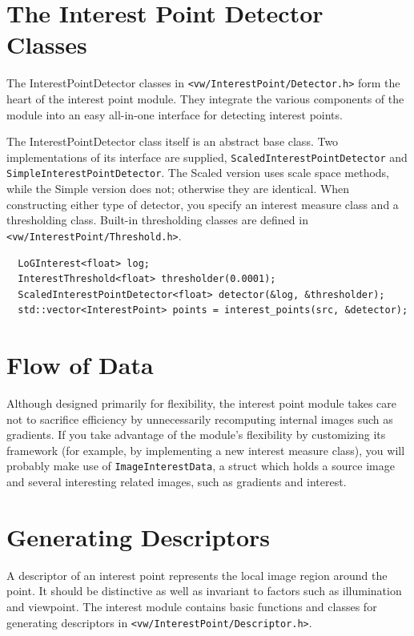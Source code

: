 \section{The Interest Point Detector Classes}
The InterestPointDetector classes in
{\tt <vw/InterestPoint/Detector.h>} form the heart of the interest
point module. They integrate the various components of the module
into an easy all-in-one interface for detecting interest points.

The InterestPointDetector class itself is an abstract base class.
Two implementations of its interface are supplied,
{\tt ScaledInterestPointDetector} and {\tt SimpleInterestPointDetector}.
The Scaled version uses scale space methods, while the Simple version
does not; otherwise they are identical. When constructing either
type of detector, you specify an interest measure class and a
thresholding class. Built-in thresholding classes are defined in
{\tt <vw/InterestPoint/Threshold.h>}.

\begin{verbatim}
  LoGInterest<float> log;
  InterestThreshold<float> thresholder(0.0001);
  ScaledInterestPointDetector<float> detector(&log, &thresholder);
  std::vector<InterestPoint> points = interest_points(src, &detector);
\end{verbatim}

\section{Flow of Data}
Although designed primarily for flexibility, the interest point
module takes care not to sacrifice efficiency by unnecessarily
recomputing internal images such as gradients. If you take
advantage of the module's flexibility by customizing its
framework (for example, by implementing a new interest measure
class), you will probably make use of {\tt ImageInterestData}, a
struct which holds a source image and several interesting
related images, such as gradients and interest.

\section{Generating Descriptors}
A descriptor of an interest point represents the local image region
around the point. It should be distinctive as well as invariant to
factors such as illumination and viewpoint. The interest module
contains basic functions and classes for generating descriptors
in {\tt <vw/InterestPoint/Descriptor.h>}.

